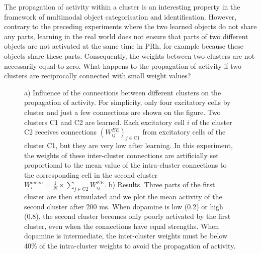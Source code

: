 \documentclass[
  11pt,
  a4paper,
]{scrbook}
\begin{document}
The propagation of activity within a cluster is an interesting property
in the framework of multimodal object categorisation and identification.
However, contrary to the preceding experiments where the two learned
objects do not share any parts, learning in the real world does not
ensure that parts of two different objects are not activated at the same
time in PRh, for example because these objects share these parts.
Consequently, the weights between two clusters are not necessarily equal
to zero. What happens to the propagation of activity if two clusters are
reciprocally connected with small weight values?

\begin{figure}


\caption{\label{fig-jocn:propagate}a) Influence of the connections
between different clusters on the propagation of activity. For
simplicity, only four excitatory cells by cluster and just a few
connections are shown on the figure. Two clusters C1 and C2 are learned.
Each excitatory cell \(i\) of the cluster C2 receives connections
\(\left(W^{EE}_{i j}\right)_{j \in \text{C1}}\) from excitatory cells of
the cluster C1, but they are very low after learning. In this
experiment, the weights of these inter-cluster connections are
artificially set proportional to the mean value of the intra-cluster
connections to the corresponding cell in the second cluster
\(W^{mean}_i = \frac{1}{N} \times \sum_{j \in \text{C2}} W^{EE}_{i j}\).
b) Results. Three parts of the first cluster are then stimulated and we
plot the mean activity of the second cluster after 200 ms. When dopamine
is low (0.2) or high (0.8), the second cluster becomes only poorly
activated by the first cluster, even when the connections have equal
strengths. When dopamine is intermediate, the inter-cluster weights must
be below 40\% of the intra-cluster weights to avoid the propagation of
activity.}

\end{figure}%
\end{document}
